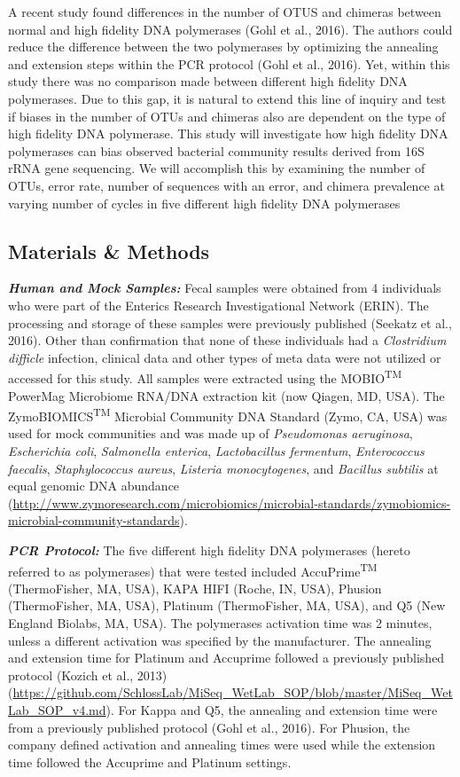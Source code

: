 \documentclass[11pt,]{article}
\begin{document}
A recent study found differences in the number of OTUS and chimeras
between normal and high fidelity DNA polymerases (Gohl et al., 2016).
The authors could reduce the difference between the two polymerases by
optimizing the annealing and extension steps within the PCR protocol
(Gohl et al., 2016). Yet, within this study there was no comparison made
between different high fidelity DNA polymerases. Due to this gap, it is
natural to extend this line of inquiry and test if biases in the number
of OTUs and chimeras also are dependent on the type of high fidelity DNA
polymerase. This study will investigate how high fidelity DNA
polymerases can bias observed bacterial community results derived from
16S rRNA gene sequencing. We will accomplish this by examining the
number of OTUs, error rate, number of sequences with an error, and
chimera prevalence at varying number of cycles in five different high
fidelity DNA polymerases

\newpage

\subsection{Materials \& Methods}\label{materials-methods}

\textbf{\emph{Human and Mock Samples:}} Fecal samples were obtained from
4 individuals who were part of the Enterics Research Investigational
Network (ERIN). The processing and storage of these samples were
previously published (Seekatz et al., 2016). Other than confirmation
that none of these individuals had a \emph{Clostridium difficle}
infection, clinical data and other types of meta data were not utilized
or accessed for this study. All samples were extracted using the
MOBIO\textsuperscript{TM} PowerMag Microbiome RNA/DNA extraction kit
(now Qiagen, MD, USA). The ZymoBIOMICS\textsuperscript{TM} Microbial
Community DNA Standard (Zymo, CA, USA) was used for mock communities and
was made up of \emph{Pseudomonas aeruginosa}, \emph{Escherichia coli},
\emph{Salmonella enterica}, \emph{Lactobacillus fermentum},
\emph{Enterococcus faecalis}, \emph{Staphylococcus aureus},
\emph{Listeria monocytogenes}, and \emph{Bacillus subtilis} at equal
genomic DNA abundance
(\url{http://www.zymoresearch.com/microbiomics/microbial-standards/zymobiomics-microbial-community-standards}).

\textbf{\emph{PCR Protocol:}} The five different high fidelity DNA
polymerases (hereto referred to as polymerases) that were tested
included AccuPrime\textsuperscript{TM} (ThermoFisher, MA, USA), KAPA
HIFI (Roche, IN, USA), Phusion (ThermoFisher, MA, USA), Platinum
(ThermoFisher, MA, USA), and Q5 (New England Biolabs, MA, USA). The
polymerases activation time was 2 minutes, unless a different activation
was specified by the manufacturer. The annealing and extension time for
Platinum and Accuprime followed a previously published protocol (Kozich
et al., 2013)
(\url{https://github.com/SchlossLab/MiSeq_WetLab_SOP/blob/master/MiSeq_WetLab_SOP_v4.md}).
For Kappa and Q5, the annealing and extension time were from a
previously published protocol (Gohl et al., 2016). For Phusion, the
company defined activation and annealing times were used while the
extension time followed the Accuprime and Platinum settings.
\end{document}
